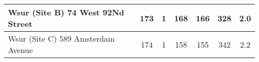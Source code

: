 {\begin{tabular}{l|c|c|c|c|c|c|}
                                                             \\ \hline\multicolumn{1}{|l|}{\cellcolor{ccteallight}Wsur (Site B) 74 West 92Nd Street}        & 173                                                   & 1                            & 168                                                   & 166                                                           & 328                                                                & 2.0                                                                \\ \hline\multicolumn{1}{|l|}{\cellcolor{ccteallight}Wsur (Site C) 589 Amsterdam Avenue}        & 174                                                   & 1                            & 158                                                   & 155                                                           & 342                                                                & 2.2                                                                \\ \hline
    \end{tabular}
    }
    